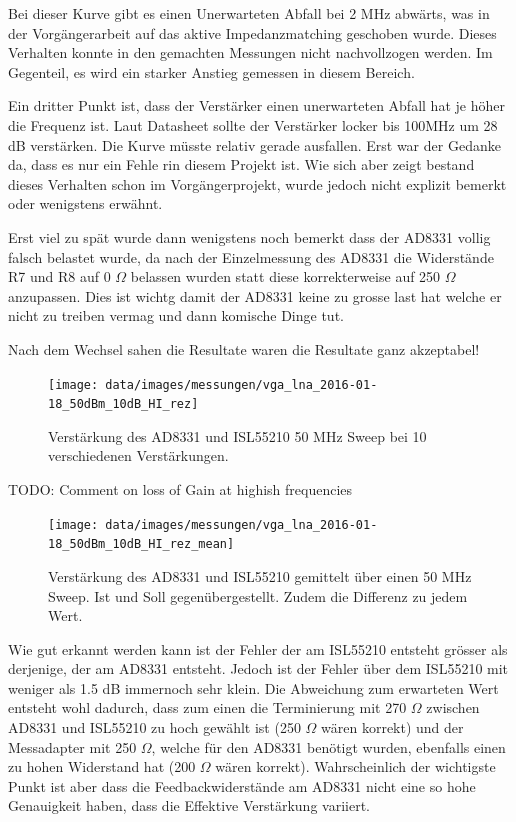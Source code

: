 Bei dieser Kurve gibt es einen Unerwarteten Abfall bei 2 MHz abwärts, was in der Vorgängerarbeit auf das aktive Impedanzmatching geschoben wurde. Dieses Verhalten konnte in den gemachten Messungen nicht nachvollzogen werden. Im Gegenteil, es wird ein starker Anstieg gemessen in diesem Bereich.

Ein dritter Punkt ist, dass der Verstärker einen unerwarteten Abfall hat je höher die Frequenz ist. Laut Datasheet sollte der Verstärker locker bis 100MHz um 28 dB verstärken. Die Kurve müsste relativ gerade ausfallen. Erst war der Gedanke da, dass es nur ein Fehle rin diesem Projekt ist. Wie sich aber zeigt bestand dieses Verhalten schon im Vorgängerprojekt, wurde jedoch nicht explizit bemerkt oder wenigstens erwähnt.

Erst viel zu spät wurde dann wenigstens noch bemerkt dass der AD8331 vollig falsch belastet wurde, da nach der Einzelmessung des AD8331 die Widerstände R7 und R8 auf 0 $\Omega$ belassen wurden statt diese korrekterweise auf 250 $\Omega$ anzupassen. Dies ist wichtg damit der AD8331 keine zu grosse last hat welche er nicht zu treiben vermag und dann komische Dinge tut.

Nach dem Wechsel sahen die Resultate waren die Resultate ganz akzeptabel!

\begin{figure}[H]
\begin{center}
    \texttt{[image: data/images/messungen/vga\_lna\_2016-01-18\_50dBm\_10dB\_HI\_rez]}
    \caption{Verstärkung des AD8331 und ISL55210 50 MHz Sweep bei 10 verschiedenen Verstärkungen.}
    \label{fig:T_fixed_ISL55210}
\end{center}
\end{figure}

TODO: Comment on loss of Gain at highish frequencies 

\begin{figure}[H]
\begin{center}
    \texttt{[image: data/images/messungen/vga\_lna\_2016-01-18\_50dBm\_10dB\_HI\_rez\_mean]}
    \caption{Verstärkung des AD8331 und ISL55210 gemittelt über einen 50 MHz Sweep. Ist und Soll gegenübergestellt. Zudem die Differenz zu jedem Wert.}
    \label{fig:T_fixed_mean_ISL55210}
\end{center}
\end{figure}

Wie gut erkannt werden kann ist der Fehler der am ISL55210 entsteht grösser als derjenige, der am AD8331 entsteht. Jedoch ist der Fehler über dem ISL55210 mit weniger als 1.5 dB immernoch sehr klein. Die Abweichung zum erwarteten Wert entsteht wohl dadurch, dass zum einen die Terminierung mit 270 $\Omega$ zwischen AD8331 und ISL55210 zu hoch gewählt ist (250 $\Omega$ wären korrekt) und der Messadapter mit 250 $\Omega$, welche für den AD8331 benötigt wurden, ebenfalls einen zu hohen Widerstand hat (200 $\Omega$ wären korrekt). Wahrscheinlich der wichtigste Punkt ist aber dass die Feedbackwiderstände am AD8331 nicht eine so hohe Genauigkeit haben, dass die Effektive Verstärkung variiert.
